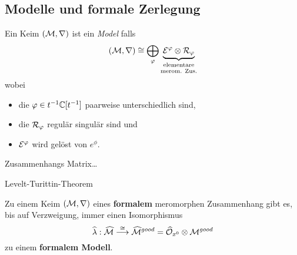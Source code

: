 \subsection{Modelle und formale Zerlegung}
\begin{frame}[t]
  \begin{defn}
    Ein Keim $(\mathcal{M},\nabla)$ ist ein \emph{Model} falls
    \[
      (\cM,\nabla)
      \cong
      \bigoplus_\phi
      \underset{\text{merom. Zus.}}{%
        \underset{\text{elementare}}{%
          \underbrace{\cE^\phi\otimes\cR_\phi}
        }
      }
    \]
    wobei
    \begin{itemize}
      \item die $\varphi\in t^{-1}\mathbb{C}[t^{-1}]$ paarweise unterschiedlich sind,
      \item die $\mathcal{R}_\varphi$ regulär singulär sind und
      \item $\mathcal{E}^\varphi$ wird gelöst von $e^\phi$.
    \end{itemize}
  \end{defn}
\end{frame}
\begin{frame}[t]{Zusammenhangs Matrix\dots}
  
\end{frame}
\begin{frame}[t]{Levelt-Turittin-Theorem}
  \begin{tthm}
    Zu einem Keim $(\mathcal{M},\nabla)$ eines \textbf{formalem} meromorphen
    Zusammenhang gibt es, bis auf Verzweigung, immer einen Isomorphismus
    \[
      \widehat\lambda:\widehat{\mathcal{M}}
      \overset{\cong}\longrightarrow
      \widehat{\mathcal{M}}^{good}
      =\widehat{\mathcal{O}}_{x^0}\otimes\mathcal{M}^{good}
    \]
    zu einem \textbf{formalem Modell}.
  \end{tthm}
\end{frame}

